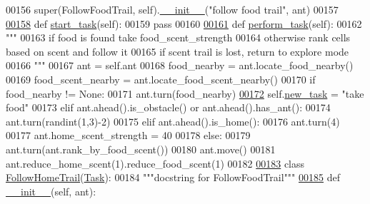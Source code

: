 \begin{DoxyCode}
00156         super(FollowFoodTrail, self).\hyperlink{classtask__manager_1_1FollowFoodTrail_a6af05bfd09141281c9943c8f01a0896b}{\_\_init\_\_}(\textcolor{stringliteral}{"follow food trail"}, ant)
00157 
\hypertarget{task__manager_8py_source_l00158}{}\hyperlink{classtask__manager_1_1FollowFoodTrail_a68013dbb3ab9d25676217de4d22c48eb}{00158}     \textcolor{keyword}{def }\hyperlink{classtask__manager_1_1FollowFoodTrail_a68013dbb3ab9d25676217de4d22c48eb}{start\_task}(self):
00159         \textcolor{keywordflow}{pass}
00160 
\hypertarget{task__manager_8py_source_l00161}{}\hyperlink{classtask__manager_1_1FollowFoodTrail_aa805a2a4e9a76ba7afa252ca5efbd121}{00161}     \textcolor{keyword}{def }\hyperlink{classtask__manager_1_1FollowFoodTrail_aa805a2a4e9a76ba7afa252ca5efbd121}{perform\_task}(self):
00162         \textcolor{stringliteral}{"""}
00163 \textcolor{stringliteral}{        if food is found take food\_scent\_strength}
00164 \textcolor{stringliteral}{        otherwise rank cells based on scent and follow it}
00165 \textcolor{stringliteral}{        if scent trail is lost, return to explore mode}
00166 \textcolor{stringliteral}{        """}
00167         ant = self.ant
00168         food\_nearby = ant.locate\_food\_nearby()
00169         food\_scent\_nearby = ant.locate\_food\_scent\_nearby()
00170         \textcolor{keywordflow}{if} food\_nearby != \textcolor{keywordtype}{None}:
00171             ant.turn(food\_nearby)
\hypertarget{task__manager_8py_source_l00172}{}\hyperlink{classtask__manager_1_1FollowFoodTrail_aefc8c49492622a4e4fa61279fd52ed12}{00172}             self.\hyperlink{classtask__manager_1_1Task_af16658f4c3c447e24f73ed3d1803e058}{new\_task} = \textcolor{stringliteral}{"take food"}
00173         \textcolor{keywordflow}{elif} ant.ahead().is\_obstacle() \textcolor{keywordflow}{or} ant.ahead().has\_ant():
00174             ant.turn(randint(1,3)-2)
00175         \textcolor{keywordflow}{elif} ant.ahead().is\_home():
00176             ant.turn(4)
00177             ant.home\_scent\_strength = 40
00178         \textcolor{keywordflow}{else}:
00179             ant.turn(ant.rank\_by\_food\_scent())
00180             ant.move()
00181         ant.reduce\_home\_scent(1).reduce\_food\_scent(1)
00182 
\hypertarget{task__manager_8py_source_l00183}{}\hyperlink{classtask__manager_1_1FollowHomeTrail}{00183} \textcolor{keyword}{class }\hyperlink{classtask__manager_1_1FollowHomeTrail}{FollowHomeTrail}(\hyperlink{classtask__manager_1_1Task}{Task}):
00184     \textcolor{stringliteral}{"""docstring for FollowFoodTrail"""}
\hypertarget{task__manager_8py_source_l00185}{}\hyperlink{classtask__manager_1_1FollowHomeTrail_a644c02e687f8a412a39e81628742f3b5}{00185}     \textcolor{keyword}{def }\hyperlink{classtask__manager_1_1FollowHomeTrail_a644c02e687f8a412a39e81628742f3b5}{\_\_init\_\_}(self, ant):

\end{DoxyCode}
